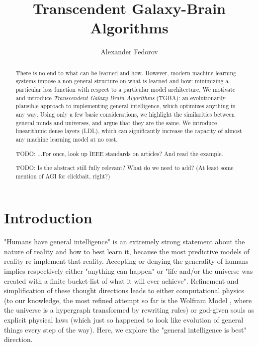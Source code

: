 \documentclass{article}
\begin{document}
\title{Transcendent Galaxy-Brain Algorithms}
\author{Alexander Fedorov}
\date{}

\maketitle

\begin{abstract}

There is no end to what can be learned and how. However, modern machine learning systems impose a non-general structure on what is learned and how: minimizing a particular loss function with respect to a particular model architecture. We motivate and introduce \textit{Transcendent Galaxy-Brain Algorithms} (TGBA): an evolutionarily-plausible approach to implementing general intelligence, which optimizes anything in any way. Using only a few basic considerations, we highlight the similarities between general minds and universes, and argue that they are the same. We introduce linearithmic dense layers (LDL), which can significantly increase the capacity of almost any machine learning model at no cost.

    TODO: ...For once, look up IEEE standards on articles? And read the example.

    TODO: Is the abstract still fully relevant? What do we need to add? (At least some mention of AGI for clickbait, right?)

\end{abstract}

\section{Introduction}

"Humans have general intelligence" is an extremely strong statement about the nature of reality and how to best learn it, because the most predictive models of reality re-implement that reality. Accepting or denying the generality of humans implies respectively either "anything can happen" or "life and/or the universe was created with a finite bucket-list of what it will ever achieve". Refinement and simplification of these thought directions leads to either computational physics (to our knowledge, the most refined attempt so far is the Wolfram Model \cite{Wolfram_2020}, where the universe is a hypergraph transformed by rewriting rules) or god-given souls as explicit physical laws (which just so happened to look like evolution of general things every step of the way). Here, we explore the "general intelligence is best" direction.
\end{document}
